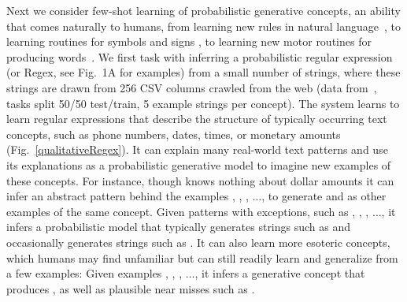 \documentclass[12pt]{article}
\begin{document}
Next we consider few-shot learning of probabilistic generative concepts, an ability that comes naturally to
humans, from learning new rules in natural language~\cite{marcus1999rule},
to learning routines for symbols and signs
\cite{lake2015human},
to learning new motor routines for producing words~\cite{lake2014one}.
We first %
task \system with inferring a probabilistic regular expression (or Regex, see Fig.~1A for examples) from a small number of strings, where these strings are drawn from 256 CSV columns crawled from the web (data from~\cite{mws}, tasks split 50/50 test/train, 5 example strings per concept). The system learns to learn
regular expressions that describe the structure of  typically occurring text concepts,
such as phone numbers, dates, times, or monetary amounts (Fig.~\ref{qualitativeRegex}).
It can explain many real-world text patterns
and use its explanations as a probabilistic generative model to imagine new examples of these concepts. %
For instance, though \system knows nothing about dollar amounts it can infer an abstract pattern behind the examples , , , $\dots$, to generate  and  as other examples of the same concept.
Given patterns with exceptions,
such as
, , , $\dots$, 
it infers a probabilistic model that typically generates strings such as
 and occasionally generates strings such as .
It can also learn more esoteric concepts, which humans may find unfamiliar but can still readily learn and generalize from a few examples: Given examples , , , $\dots$, it infers a generative concept that produces , as well as plausible near misses such as .
\end{document}
